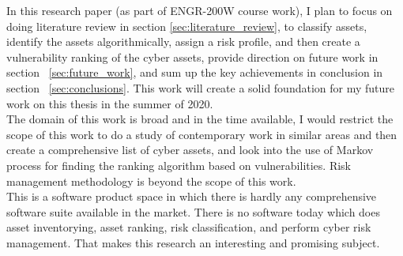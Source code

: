 In this research paper (as part of ENGR-200W course work), I plan to focus on doing literature review in section \ref{sec:literature_review}, to classify assets, identify the assets algorithmically, assign a risk profile, and then create a vulnerability ranking of the cyber assets, provide direction on future work in section ~\ref{sec:future_work}, and sum up the key achievements in conclusion in section ~\ref{sec:conclusions}. This work will create a solid foundation for my future work on this thesis in the summer of 2020. \\
The domain of this work is broad and in the time available, I would restrict the scope of this work to do a study of contemporary work in similar areas and then create a comprehensive list of cyber assets, and look into the use of Markov process for finding the ranking algorithm based on vulnerabilities. Risk management methodology is beyond the scope of this work.\\ 
This is a software product space in which there is hardly any comprehensive software suite available in the market. There is no software today which does asset inventorying, asset ranking, risk classification, and perform cyber risk management. That makes this research an interesting and promising subject.\\ 

